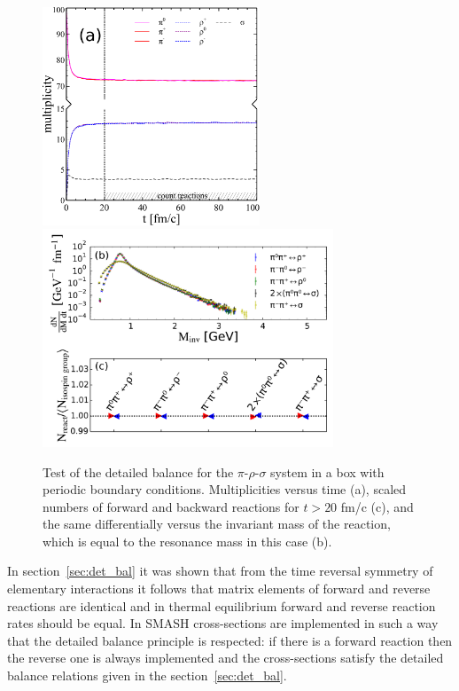 \begin{figure}
  \includegraphics[height=6.5cm]{plots/smash/detailed_balance/rho_pi_sigma1.pdf}
  \includegraphics[height=6.5cm]{plots/smash/detailed_balance/react_num.pdf}
  \caption{Test of the detailed balance for the $\pi$-$\rho$-$\sigma$ system in a box
           with periodic boundary conditions. Multiplicities versus time (a), scaled
           numbers of forward and backward reactions for $t>20$ fm/c (c), and the same
           differentially versus the invariant mass of the reaction, which is equal to
           the resonance mass in this case (b).} \label{fig:pi_rho_sig_box}
\end{figure}

In section~\ref{sec:det_bal} it was shown that from the time reversal
symmetry of elementary interactions it follows that matrix elements of forward
and reverse reactions are identical and in thermal equilibrium forward and
reverse reaction rates should be equal. In SMASH cross-sections are implemented
in such a way that the detailed balance principle is respected: if there is a
forward reaction then the reverse one is always implemented and the
cross-sections satisfy the detailed balance relations given in the
section~\ref{sec:det_bal}.

